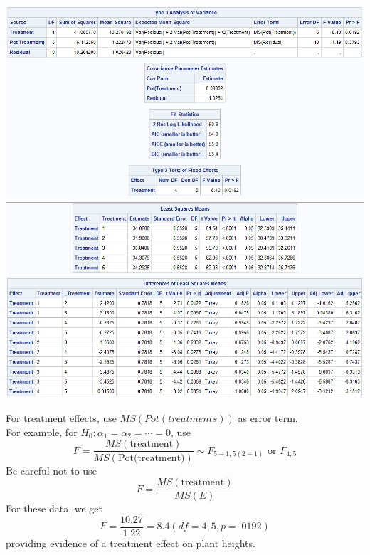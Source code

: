 \begin{center}
\includegraphics[scale=0.7]{Heights}\\
\includegraphics[scale=0.7]{Heights2}
\end{center}

\newpage

For treatment effects, use $MS(Pot(treatments))$ as error term.  \\
For example, for $H_0: \alpha_1=\alpha_2=\cdots=0$, use
$$ F = \frac{MS(\mbox{treatment})}{MS(\mbox{Pot(treatment)})} \sim F_{5-1,5(2-1)} \mbox{ or }F_{4,5}$$
Be careful not to use
$$ F = \frac{MS(\mbox{treatment})}{MS(E)}$$
For these data, we get
$$ F=\frac{10.27}{1.22}=8.4 (df=4,5, p=.0192)$$
providing evidence of a treatment effect on plant heights.
